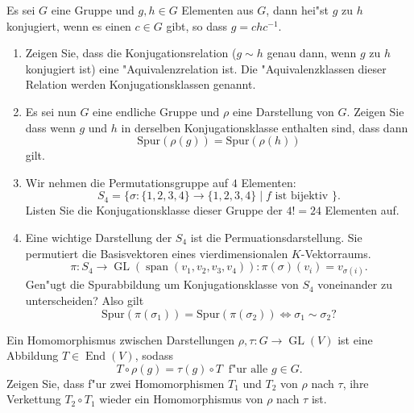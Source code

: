 \documentclass[a4,11pt]{article}
\begin{document}
\begin{aufgabe}[4 Punkte]
Es sei $G$ eine Gruppe und $g,h \in G$ Elementen aus $G$, dann hei"st $g$ zu $h$ konjugiert, wenn es einen $c \in G$ gibt, so dass $g = chc^{-1}$.\begin{enumerate}
\item
Zeigen Sie, dass die Konjugationsrelation ($g \sim h$ genau dann, wenn $g$ zu $h$ konjugiert ist) eine "Aquivalenzrelation ist. Die "Aquivalenzklassen dieser Relation werden Konjugationsklassen genannt.
\item
Es sei nun $G$ eine endliche Gruppe und $\rho$ eine Darstellung von $G$. Zeigen Sie dass wenn $g$ und $h$ in derselben Konjugationsklasse enthalten sind, dass dann
\[
\text{Spur}(\rho(g)) = \text{Spur}(\rho(h)) 
\]
gilt.
\item
Wir nehmen die Permutationsgruppe auf $4$ Elementen:
\[
S_4 = \{ \sigma : \{ 1,2,3,4 \} \to \{ 1,2,3,4 \} \mid f \text{ ist bijektiv } \}.
\]
Listen Sie die Konjugationsklasse dieser Gruppe der $4! = 24$ Elementen auf.
\item
Eine wichtige Darstellung der $S_4$ ist die Permuationsdarstellung. Sie permutiert die Basisvektoren eines vierdimensionalen $K$-Vektorraums.
\[
\pi : S_4 \to \operatorname{GL}(\operatorname{span}(v_1, v_2, v_3, v_4)) : \pi(\sigma)(v_i) = v_{\sigma(i)}.
\]
Gen"ugt die Spurabbildung um Konjugationsklasse von $S_4$ voneinander zu unterscheiden? Also gilt
\[
\text{Spur}(\pi(\sigma_1)) = \text{Spur}(\pi(\sigma_2)) \Leftrightarrow \sigma_1 \sim \sigma_2 ?
\]
\end{enumerate}

\end{aufgabe}

\begin{aufgabe}[4 Punkte]
Ein Homomorphismus zwischen Darstellungen $\rho, \tau : G \to \operatorname{GL}(V)$ ist eine Abbildung $T \in \operatorname{End}(V)$, sodass
\[
T \circ \rho(g) = \tau(g) \circ T \ \text{ f"ur alle } g \in G.
\]
Zeigen Sie, dass f"ur zwei Homomorphismen $T_1$ und $T_2$ von $\rho$ nach $\tau$, ihre Verkettung $T_2 \circ T_1$ wieder ein Homomorphismus von $\rho$ nach $\tau$ ist.
\end{aufgabe}
\end{document}
